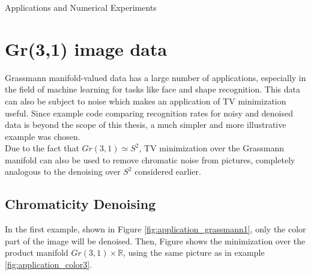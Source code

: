 \begin{chapter}{Applications and Numerical Experiments}
\FloatBarrier
\section{Gr(3,1) image data} %
\label{sec:Gr31imagedata}
Grassmann manifold-valued data has a large number of applications, especially in the field of machine learning
for tasks like face and shape recognition. This data can also be subject to noise which makes an application
of TV minimization useful. Since example code comparing recognition rates for noisy and denoised data is
beyond the scope of this thesis, a much simpler and more illustrative example was chosen. \\

Due to the fact that $Gr(3,1)\simeq S^2$, TV minimization over the Grassmann manifold can also be used to remove
chromatic noise from pictures, completely analogous to the denoising over $S^2$ considered earlier. 

\subsection{Chromaticity Denoising}
In the first example, shown in Figure \ref{fig:application_grassmann1}, only the color part of the image will be denoised. 
Then, Figure \label{fig:application_grassmann2} shows the minimization over the product manifold $Gr(3,1)\times \mathbb{R}$, using the same picture as in example \ref{fig:application_color3}.


\end{chapter}
